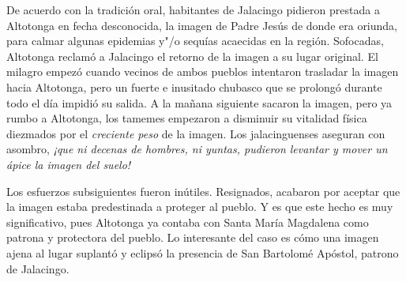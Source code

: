 \documentclass[14pt,twoside,final]{extbook} %
\begin{document}
De acuerdo con la tradición oral, habitantes de Jalacingo pidieron prestada a Altotonga en fecha desconocida, la imagen de Padre Jesús de donde era oriunda, para calmar algunas epidemias y"/o sequías acaecidas en la región. Sofocadas, Altotonga reclamó a Jalacingo el retorno de la imagen a su lugar original. El milagro empezó cuando vecinos de ambos pueblos intentaron trasladar la imagen hacia Altotonga, pero un fuerte e inusitado chubasco que se prolongó durante todo el día impidió su salida. A la mañana siguiente sacaron la imagen, pero ya rumbo a Altotonga, los tamemes empezaron a disminuir su vitalidad física diezmados por el \emph{creciente peso} de la imagen. Los jalacinguenses aseguran con asombro, \emph{¡que ni decenas de hombres, ni yuntas, pudieron levantar y mover un ápice la imagen del suelo!}

Los esfuerzos subsiguientes fueron inútiles. Resignados, acabaron por aceptar que la imagen estaba predestinada a proteger al pueblo. Y es que este hecho es muy significativo, pues Altotonga ya contaba con Santa María Magdalena como patrona y protectora del pueblo. Lo interesante del caso es cómo una imagen ajena al lugar suplantó y eclipsó la presencia de San Bartolomé Apóstol, patrono de Jalacingo.
\end{document}
